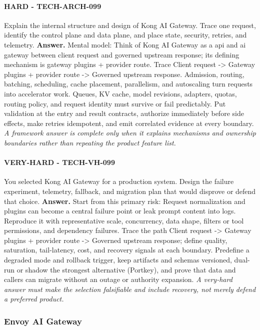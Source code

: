 \paragraph{HARD - TECH-ARCH-099} Explain the internal structure and design of Kong AI Gateway. Trace one request, identify the control plane and data plane, and place state, security, retries, and telemetry.
\textbf{Answer.} Mental model: Think of Kong AI Gateway as a api and ai gateway between client request and governed upstream response; its defining mechanism is gateway plugins + provider route. Trace Client request -> Gateway plugins + provider route -> Governed upstream response. Admission, routing, batching, scheduling, cache placement, parallelism, and autoscaling turn requests into accelerator work. Queues, KV cache, model revisions, adapters, quotas, routing policy, and request identity must survive or fail predictably. Put validation at the entry and result contracts, authorize immediately before side effects, make retries idempotent, and emit correlated evidence at every boundary.
\textit{A framework answer is complete only when it explains mechanisms and ownership boundaries rather than repeating the product feature list.}
\paragraph{VERY-HARD - TECH-VH-099} You selected Kong AI Gateway for a production system. Design the failure experiment, telemetry, fallback, and migration plan that would disprove or defend that choice.
\textbf{Answer.} Start from this primary risk: Request normalization and plugins can become a central failure point or leak prompt content into logs. Reproduce it with representative scale, concurrency, data shape, filters or tool permissions, and dependency failures. Trace the path Client request -> Gateway plugins + provider route -> Governed upstream response; define quality, saturation, tail-latency, cost, and recovery signals at each boundary. Predefine a degraded mode and rollback trigger, keep artifacts and schemas versioned, dual-run or shadow the strongest alternative (Portkey), and prove that data and callers can migrate without an outage or authority expansion.
\textit{A very-hard answer must make the selection falsifiable and include recovery, not merely defend a preferred product.}
\subsubsection*{Envoy AI Gateway}
